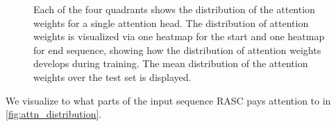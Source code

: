 \begin{figure}
	\centering
	
		\caption{Each of the four quadrants shows the distribution of the attention weights for a single attention head. The distribution of attention weights is visualized via one heatmap for the start and one heatmap for end sequence, showing how the distribution of attention weights develops during training. The mean distribution of the attention weights over the test set is displayed.}
		\label{fig:attn_heatmap}

	
\end{figure}

We visualize to what parts of the input sequence RASC pays attention to in \ref{fig:attn_distribution}. 



